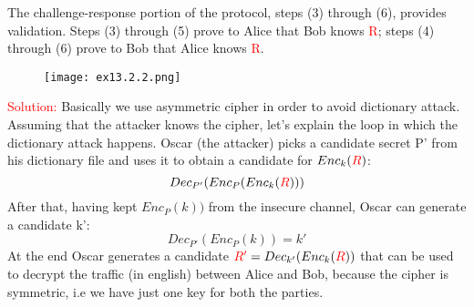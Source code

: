 \documentclass{article}
\begin{document}
The challenge-response portion of the protocol, steps (3) through (6), provides
validation. Steps (3) through (5) prove to Alice that Bob knows \textcolor{red}{R}; steps (4)
through (6) prove to Bob that Alice knows \textcolor{red}{R}.
\begin{figure} [H]
    \centering
    \texttt{[image: ex13.2.2.png]}
\end{figure}
\textcolor{red}{Solution:}
\newline
Basically we use asymmetric cipher in order to avoid dictionary attack. 
\newline Assuming that the attacker knows the cipher, let's explain the loop in which the dictionary attack happens.
Oscar (the attacker) picks a candidate secret P' from his dictionary file and uses it to obtain a candidate for $Enc_k(\textcolor{red}{R})$:
\begin{equation*}
    Dec_{P'}(Enc_P(Enc_k(\textcolor{red}{R})))
\end{equation*}
After that, having kept $Enc_P(k))$ from the insecure channel, Oscar can generate a candidate k':
\begin{equation*}
    Dec_{P'}(Enc_P(k)) = k'
\end{equation*}
At the end Oscar generates a candidate $\textcolor{red}{R'} = Dec_{k'}(Enc_k(\textcolor{red}{R}))$ that can be used to decrypt the traffic (in english) between Alice and Bob, because the cipher is symmetric, i.e we have just one key for both the parties.
\end{document}
